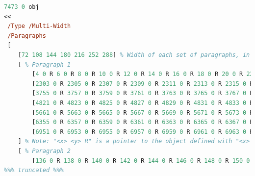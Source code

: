 \begin{lstlisting}[label=lst:pdfpartree,captionpos=b,language=postscript,float,basicstyle=\ttfamily\footnotesize,caption={[Excerpt from a Galley Structure Tree]An excerpt from a Galley Structure Tree in a malleable document \pdf{} file. The tree structure described in Figure~\ref{fig:tree} can be observed in the \texttt{/Paragraphs} array, with the exception that the first element is an array containing the widths of each included galley rendering.}]
7473 0 obj
<<
 /Type /Multi-Width
 /Paragraphs
 [
    [72 108 144 180 216 252 288] % Width of each set of paragraphs, in points (ie 72*inch)
    [ % Paragraph 1
        [4 0 R 6 0 R 8 0 R 10 0 R 12 0 R 14 0 R 16 0 R 18 0 R 20 0 R 22 0 R 24 0 R 26 0 R 28 0 R 30 0 R 32 0 R 34 0 R 36 0 R 38 0 R 40 0 R 42 0 R 44 0 R 46 0 R 48 0 R 50 0 R 52 0 R 54 0 R 56 0 R 58 0 R 60 0 R 62 0 R 64 0 R 66 0 R 68 0 R 70 0 R 72 0 R 74 0 R 76 0 R 78 0 R 80 0 R 82 0 R 84 0 R 86 0 R 88 0 R 90 0 R 92 0 R 94 0 R 96 0 R 98 0 R 100 0 R 102 0 R 104 0 R 106 0 R 108 0 R 110 0 R 112 0 R 114 0 R 116 0 R 118 0 R 120 0 R 122 0 R 124 0 R 126 0 R 128 0 R 130 0 R 132 0 R 134 0 R]
        [2303 0 R 2305 0 R 2307 0 R 2309 0 R 2311 0 R 2313 0 R 2315 0 R 2317 0 R 2319 0 R 2321 0 R 2323 0 R 2325 0 R 2327 0 R 2329 0 R 2331 0 R 2333 0 R 2335 0 R 2337 0 R 2339 0 R 2341 0 R 2343 0 R 2345 0 R 2347 0 R 2349 0 R 2351 0 R 2353 0 R 2355 0 R 2357 0 R 2359 0 R 2361 0 R 2363 0 R 2365 0 R 2367 0 R 2369 0 R 2371 0 R 2373 0 R 2375 0 R 2377 0 R 2379 0 R 2381 0 R 2383 0 R]
        [3755 0 R 3757 0 R 3759 0 R 3761 0 R 3763 0 R 3765 0 R 3767 0 R 3769 0 R 3771 0 R 3773 0 R 3775 0 R 3777 0 R 3779 0 R 3781 0 R 3783 0 R 3785 0 R 3787 0 R 3789 0 R 3791 0 R 3793 0 R 3795 0 R 3797 0 R 3799 0 R 3801 0 R 3803 0 R 3805 0 R 3807 0 R 3809 0 R 3811 0 R 3813 0 R]
        [4821 0 R 4823 0 R 4825 0 R 4827 0 R 4829 0 R 4831 0 R 4833 0 R 4835 0 R 4837 0 R 4839 0 R 4841 0 R 4843 0 R 4845 0 R 4847 0 R 4849 0 R 4851 0 R 4853 0 R 4855 0 R 4857 0 R 4859 0 R 4861 0 R 4863 0 R 4865 0 R 4867 0 R]
        [5661 0 R 5663 0 R 5665 0 R 5667 0 R 5669 0 R 5671 0 R 5673 0 R 5675 0 R 5677 0 R 5679 0 R 5681 0 R 5683 0 R 5685 0 R 5687 0 R 5689 0 R 5691 0 R 5693 0 R 5695 0 R 5697 0 R 5699 0 R]
        [6355 0 R 6357 0 R 6359 0 R 6361 0 R 6363 0 R 6365 0 R 6367 0 R 6369 0 R 6371 0 R 6373 0 R 6375 0 R 6377 0 R 6379 0 R 6381 0 R 6383 0 R 6385 0 R]
        [6951 0 R 6953 0 R 6955 0 R 6957 0 R 6959 0 R 6961 0 R 6963 0 R 6965 0 R 6967 0 R 6969 0 R 6971 0 R 6973 0 R 6975 0 R 6977 0 R 6979 0 R]
    ] % Note: "<x> <y> R" is a pointer to the object defined with "<x> <y> obj" -- these all point to COG spacer objects
    [ % Paragraph 2
        [136 0 R 138 0 R 140 0 R 142 0 R 144 0 R 146 0 R 148 0 R 150 0 R 152 0 R 154 0 R 156 0 R 158 0 R 160 0 R
%%% truncated %%%
\end{lstlisting}

